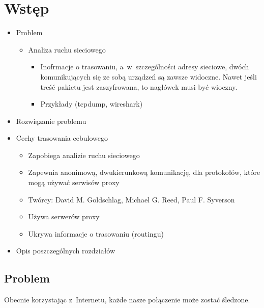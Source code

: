 \section{Wstęp}

\begin{itemize}
 \item Problem
 \begin{itemize}
  \item Analiza ruchu sieciowego
  \begin{itemize}
   \item Inofrmacje o trasowaniu, a~w~szczególności adresy sieciowe, dwóch komunikujących się ze sobą urządzeń są zawsze widoczne. Nawet jeśli treść pakietu jest zaszyfrowana, to nagłówek musi być wioczny.
   \item Przykłady (tcpdump, wireshark)
  \end{itemize}

 \end{itemize}

 \item Rozwiązanie problemu
 \item Cechy trasowania cebulowego
 \begin{itemize}
  \item Zapobiega analizie ruchu sieciowego
  \item Zapewnia anonimową, dwukierunkową komunikację, dla protokołów, które mogą używać serwisów proxy
  \item Twórcy: David M. Goldschlag, Michael G. Reed, Paul F. Syverson
  \item Używa serwerów proxy
  \item Ukrywa informacje o trasowaniu (routingu)
 \end{itemize}

 \item Opis poszczególnych rozdziałów
\end{itemize}

\subsection{Problem}
Obecnie korzystając z~Internetu, każde nasze połączenie może zostać śledzone.

